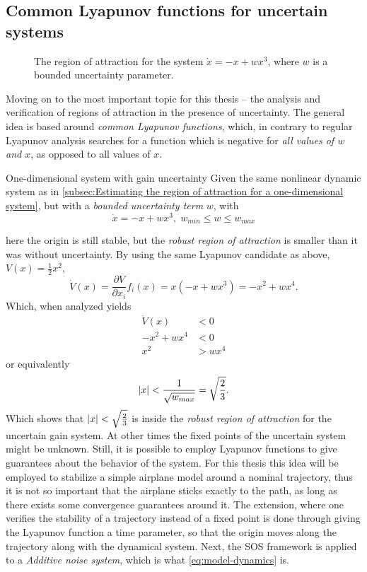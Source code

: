 \subsection{Common Lyapunov functions for uncertain systems}

\begin{figure}
  \centering
  
  \caption{The region of attraction for the system \(\dot{x} = -x + wx^3\),
    where \(w\) is a bounded uncertainty parameter.}
\end{figure}

Moving on to the most important topic for this thesis -- the analysis and
verification of regions of attraction in the presence of uncertainty. The
general idea is based around \textit{common Lyapunov functions}, which, in
contrary to regular Lyapunov analysis searches for a function which is negative
for \textit{all values of \(w\) and \(x\)}, as opposed to all values of \(x\).
\begin{example}{One-dimensional system with gain uncertainty}
  Given the same nonlinear dynamic system as in \cref{subsec:Estimating the
    region of attraction for a one-dimensional system}, but with a
  \textit{bounded uncertainty term} \(w\), with
  \[
    \dot{x} = -x + wx^3, \; w_{min} \leq w \leq w_{max}
  \]
\end{example}
here the origin is still stable, but the \textit{robust region of attraction} is
smaller than it was without uncertainty. By using the same Lyapunov candidate as
above, \(V(x) = \frac{1}{2}x^2\),
\[
  \dot{V}(x) = \frac{\partial V}{\partial x_i} f_i(x) = x(-x + wx^3) = -x^2 +
  wx^4.
\]
Which, when analyzed yields
\begin{align*}
  \dot{V}(x) &< 0 \\
  -x^2 + wx^4 &< 0 \\
  x^2 &> wx^4
\end{align*}
or equivalently
\[
  \lvert x\rvert < \frac{1}{\sqrt{w_{max}}} = \sqrt{\frac{2}{3}}.
\]
Which shows that \(\lvert x\rvert < \sqrt{\frac{2}{3}}\) is inside the \textit{robust
  region of attraction} for the uncertain gain system. At other times the fixed
points of the uncertain system might be unknown. Still, it is possible to employ
Lyapunov functions to give guarantees about the behavior of the system. For this
thesis this idea will be employed to stabilize a simple airplane model around a
nominal trajectory, thus it is not so important that the airplane sticks exactly
to the path, as long as there exists some convergence guarantees around it. The
extension, where one verifies the stability of a trajectory instead of a fixed
point is done through giving the Lyapunov function a time parameter, so that the
origin moves along the trajectory along with the dynamical system. Next, the
\ac{SOS} framework is applied to a \textit{Additive noise system}, which is what
\cref{eq:model-dynamics} is.

